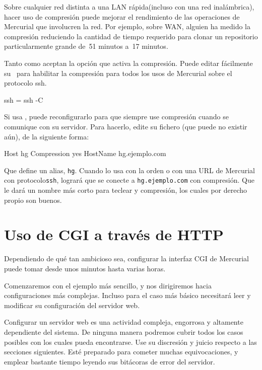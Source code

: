 Sobre cualquier red distinta a una LAN rápida(incluso con una red
inalámbrica), hacer uso de compresión puede mejorar el rendimiento
de las operaciones de Mercurial que involucren la red.  Por ejemplo,
sobre WAN, alguien ha medido la compresión reduciendo la cantidad
de tiempo requerido para clonar un repositorio particularmente
grande de~51 minutos a~17 minutos.

Tanto  como  aceptan la opción
 que activa la compresión.  Puede editar fácilmente
su \hgrc\ para habilitar la compresión para todos los usos de
Mercurial sobre el protocolo ssh.
\begin{codesample2}
  [ui]
  ssh = ssh -C
\end{codesample2}

Si usa , puede reconfigurarlo para que siempre use
compresión cuando se comunique con su servidor.  Para hacerlo,
edite su fichero (que puede no existir
aún), de la siguiente forma:
\begin{codesample2}
  Host hg
    Compression yes
    HostName hg.ejemplo.com
\end{codesample2}
Que define un alias, \texttt{hg}.  Cuando lo usa con la orden
 o con una URL de Mercurial con protocolo\texttt{ssh},
logrará que  se conecte a \texttt{hg.ejemplo.com}
con compresión.  Que le dará un nombre más corto para teclear y
compresión, los cuales por derecho propio son buenos.

\section{Uso de CGI a través de HTTP}
\label{sec:collab:cgi}

Dependiendo de qué tan ambicioso sea, configurar la interfaz CGI
de Mercurial puede tomar desde unos minutos hasta varias horas.

Comenzaremos con el ejemplo más sencillo, y nos dirigiremos hacia
configuraciones más complejas.  Incluso para el caso más básico
necesitará leer y modificar su configuración del servidor web.

\begin{note}
  Configurar un servidor web es una actividad compleja, engorrosa y
  altamente dependiente del sistema.  De ninguna manera podremos
  cubrir todos los casos posibles con los cuales pueda encontrarse.
  Use su discresión y juicio respecto a las secciones siguientes.
  Esté preparado para cometer muchas equivocaciones, y emplear
  bastante tiempo leyendo sus bitácoras de error del servidor.
\end{note}

